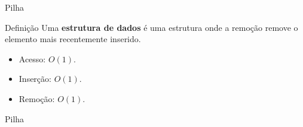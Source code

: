 \begin{frame}{Pilha}

    \begin{block}{Definição}
        Uma {\bf estrutura de dados} é uma estrutura onde a remoção remove o elemento mais recentemente inserido.
    \end{block}

    \begin{itemize}
        \item Acesso: $O(1)$.
        \item Inserção: $O(1)$.
        \item Remoção: $O(1)$.
    \end{itemize}

    \begin{block}{Pilha}
        \footnotesize
        \inputminted{cpp}{codigos/pilha.cpp}    
    \end{block}

\end{frame}


